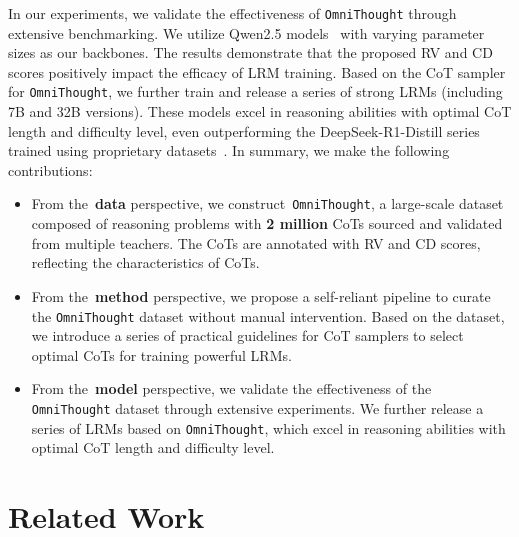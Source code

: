 \documentclass{article}
\begin{document}
In our experiments, we validate the effectiveness of \texttt{OmniThought} through extensive benchmarking. We utilize Qwen2.5 models~\cite{DBLP:journals/corr/abs-2412-15115} with varying parameter sizes as our backbones. The results demonstrate that the proposed RV and CD scores positively impact the efficacy of LRM training. Based on the CoT sampler for \texttt{OmniThought}, we further train and release a series of strong LRMs (including 7B and 32B versions). These models excel in reasoning abilities with optimal CoT length and difficulty level, even outperforming the DeepSeek-R1-Distill series trained using proprietary datasets~\cite{DBLP:journals/corr/abs-2501-12948}. In summary, we make the following contributions:
\begin{itemize}
    \item From the~\textbf{data} perspective, we construct~\texttt{OmniThought}, a large-scale dataset composed of reasoning problems with \textbf{2 million} CoTs sourced and validated from multiple teachers. The CoTs are annotated with RV and CD scores, reflecting the characteristics of CoTs.
    
    \item From the~\textbf{method} perspective, we propose a self-reliant pipeline to curate the \texttt{OmniThought} dataset without manual intervention. Based on the dataset, we introduce a series of practical guidelines for CoT samplers to select optimal CoTs for training powerful LRMs. 
    
    \item From the~\textbf{model} perspective, we validate the effectiveness of the \texttt{OmniThought} dataset through extensive experiments. We further release a series of LRMs based on \texttt{OmniThought}, which excel in reasoning abilities with optimal CoT length and difficulty level.
\end{itemize}











\section{Related Work}
\end{document}
